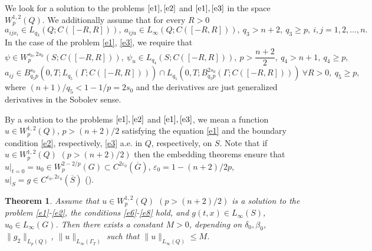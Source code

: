 \documentclass{article}
\theoremstyle{plain}
\newtheorem{theorem}{Theorem}
\begin{document}
We look for a solution to the problems   $\eqref{e1}, \eqref{e2}$ and $\eqref{e1}, \eqref{e3}$ in the space 
$W_p^{1,2}(Q)$.
We additionally assume that for every  $R>0$
\begin{equation}\label{e2051}
a_{ijx_i}\in L_{q_3}(Q;C([-R,R])), \ a_{iju}\in L_\infty(Q;C([-R,R])),   \ q_3> n+2,\ q_3\geq p,\ i,j=1,2,\ldots,n. 
\end{equation}
In the case of the problem  \eqref{e1}, \eqref{e3}, we require that 
\begin{equation}\label{e2052}
\psi\in W_p^{s_0,2s_0}(S;C([-R,R])),   \ \psi_u\in L_{q_4}(S;C([-R,R])), \   p>\frac{n+2}{2}, \ q_4> n+1, \ q_4\geq p,
\end{equation}
\begin{equation}\label{e2053}
a_{ij}\in B_{q_5p}^{s_0}(0,T; L_{q_5}(\Gamma;C([-R,R])))\cap L_{q_5}(0,T; B_{q_5p}^{2s_0}(\Gamma;C([-R,R]))) \ \forall R>0,\   q_5\geq p,
\end{equation}
where  $(n+1)/q_5< 1-1/p=2s_0$ and the derivatives are  just generalized derivatives in the Sobolev sense.

By a solution to the problems $\eqref{e1}, \eqref{e2}$ and $\eqref{e1}, \eqref{e3}$, we mean a function $u\in W_p^{1,2}(Q)$, $p>(n+2)/2$ satisfying the equation \eqref{e1} and the boundary condition \eqref{e2}, respectively, \eqref{e3} a.e. in $Q$, respectively, on $S$. 
Note that if $u\in W_p^{1,2}(Q)$ $(p>(n+2)/2)$ then the embedding theorems  ensure that 
 $u|_{t=0}=u_0\in W_p^{2-2/p}(G)\subset C^{2\varepsilon_0}(\overline{G})$, $\varepsilon_0=1-(n+2)/2p$,  
$u|_{S}=g\in C^{\varepsilon_0, 2\varepsilon_0}(\overline{S})$ (\cite[Theorems  1.19, 1.22]{pya11}). 


\begin{theorem} \label{thr2}
Assume that  $u\in W_p^{1,2}(Q)$ $(p>(n+2)/2)$ is a  solution to the problem  {\rm \eqref{e1}-\eqref{e2}}, the conditions 
   {\rm \eqref{e6}-\eqref{e8}} hold, and   $g(t,x)\in L_\infty(S)$, $u_0\in L_\infty(G)$. 
Then there exists a constant  $M>0$, depending on $\delta_0, \beta_0$,  $\|g_2\|_{L_{p}(Q)}$, $\|u\|_{L_\infty(\Gamma_T)}$
such that  $\|u\|_{L_\infty(Q)}\leq M$. 
    \end{theorem}
      
\end{document}

